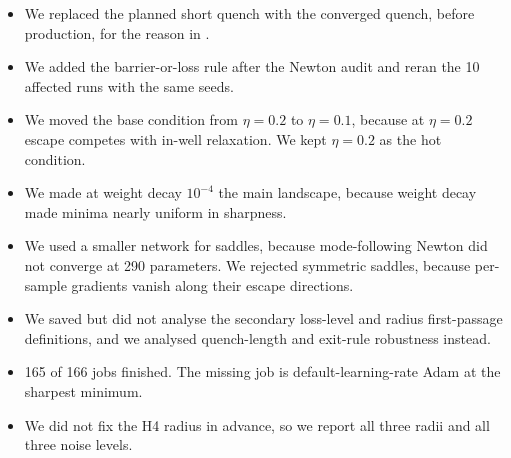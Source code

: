 \begin{itemize}[leftmargin=*,itemsep=0pt,topsep=0pt]
    \item We replaced the planned short quench with the converged quench, before production, for the reason in .
    \item We added the barrier-or-loss rule after the Newton audit and reran the 10 affected runs with the same seeds.
    \item We moved the base condition from $\eta=0.2$ to $\eta=0.1$, because at $\eta=0.2$ escape competes with in-well relaxation. We kept $\eta=0.2$ as the hot condition.
    \item We made \fmnist at weight decay $10^{-4}$ the main landscape, because weight decay made \digitsdata minima nearly uniform in sharpness.
    \item We used a smaller network for saddles, because mode-following Newton did not converge at 290 parameters. We rejected symmetric saddles, because per-sample gradients vanish along their escape directions.
    \item We saved but did not analyse the secondary loss-level and radius first-passage definitions, and we analysed quench-length and exit-rule robustness instead.
    \item 165 of 166 jobs finished. The missing job is default-learning-rate Adam at the sharpest minimum.
    \item We did not fix the H4 radius in advance, so we report all three radii and all three noise levels.
\end{itemize}
